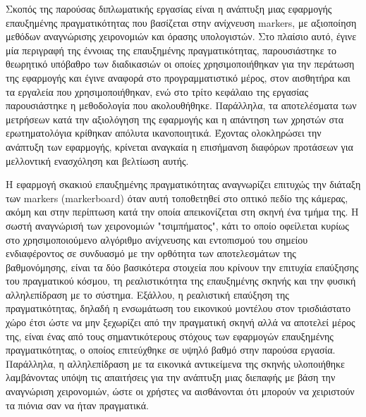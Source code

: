 




Σκοπός της παρούσας διπλωματικής εργασίας είναι η ανάπτυξη μιας εφαρμογής επαυξημένης πραγματικότητας που βασίζεται στην ανίχνευση markers, με αξιοποίηση μεθόδων αναγνώρισης χειρονομιών και όρασης υπολογιστών. Στο πλαίσιο αυτό, έγινε μία περιγραφή της έννοιας της επαυξημένης πραγματικότητας, παρουσιάστηκε το θεωρητικό υπόβαθρο των διαδικασιών οι οποίες χρησιμοποιήθηκαν για την περάτωση της εφαρμογής και έγινε αναφορά στο προγραμματιστικό μέρος, στον αισθητήρα και τα εργαλεία που χρησιμοποιήθηκαν, ενώ στο τρίτο κεφάλαιο της εργασίας παρουσιάστηκε η μεθοδολογία που ακολουθήθηκε. Παράλληλα, τα αποτελέσματα των μετρήσεων κατά την αξιολόγηση της εφαρμογής και η απάντηση των χρηστών στα ερωτηματολόγια κρίθηκαν απόλυτα ικανοποιητικά. Έχοντας ολοκληρώσει την ανάπτυξη των εφαρμογής, κρίνεται αναγκαία η επισήμανση διαφόρων προτάσεων για μελλοντική ενασχόληση και βελτίωση αυτής.


Η εφαρμογή σκακιού επαυξημένης πραγματικότητας αναγνωρίζει επιτυχώς την διάταξη των markers (markerboard) όταν αυτή τοποθετηθεί στο οπτικό πεδίο της κάμερας, ακόμη και στην περίπτωση κατά την οποία απεικονίζεται στη σκηνή ένα τμήμα της. Η σωστή αναγνώρισή των χειρονομιών "τσιμπήματος", κάτι το οποίο οφείλεται κυρίως στο χρησιμοποιούμενο αλγόριθμο ανίχνευσης και εντοπισμού του σημείου ενδιαφέροντος σε συνδυασμό με την ορθότητα των αποτελεσμάτων της βαθμονόμησης, είναι τα δύο βασικότερα στοιχεία που κρίνουν την επιτυχία επαύξησης του πραγματικού κόσμου, τη ρεαλιστικότητα της επαυξημένης σκηνής και την φυσική αλληλεπίδραση με το σύστημα. Εξάλλου, η ρεαλιστική επαύξηση της πραγματικότητας, δηλαδή η ενσωμάτωση του εικονικού μοντέλου στον τρισδιάστατο χώρο έτσι ώστε να μην ξεχωρίζει από την πραγματική σκηνή αλλά να αποτελεί μέρος της, είναι ένας από τους σημαντικότερους στόχους των εφαρμογών επαυξημένης πραγματικότητας, ο οποίος επιτεύχθηκε σε υψηλό βαθμό στην παρούσα εργασία. Παράλληλα, η αλληλεπίδραση με τα εικονικά αντικείμενα της σκηνής υλοποιήθηκε λαμβάνοντας υπόψη τις απαιτήσεις για την ανάπτυξη μιας διεπαφής με βάση την αναγνώριση χειρονομιών, ώστε οι χρήστες να αισθάνονται ότι μπορούν να χειριστούν τα πιόνια σαν να ήταν πραγματικά.


